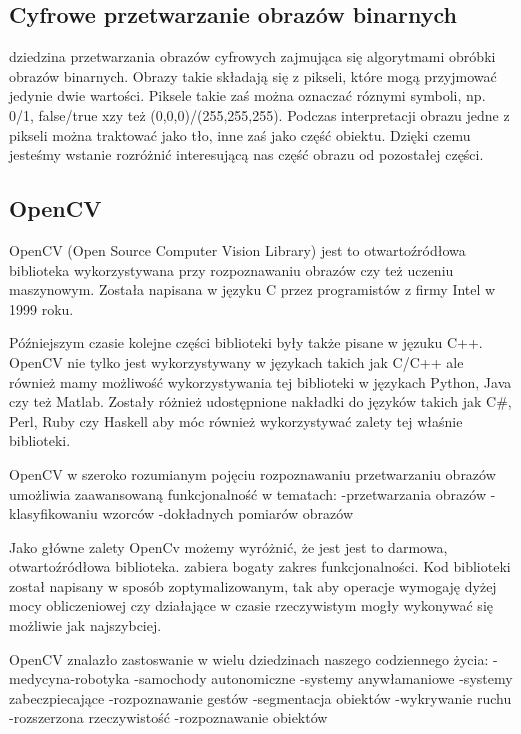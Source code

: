 \documentclass[a4paper,12pt,twoside,openany]{report}
\begin{document}
\subsection{Cyfrowe przetwarzanie obrazów binarnych}
dziedzina przetwarzania obrazów cyfrowych zajmująca się algorytmami obróbki obrazów binarnych. Obrazy takie składają się z pikseli, które mogą przyjmować jedynie dwie wartości. Piksele takie zaś można oznaczać róznymi symboli, np. 0/1, false/true xzy też (0,0,0)/(255,255,255). Podczas interpretacji obrazu jedne z pikseli można traktować jako tło, inne zaś jako część obiektu. Dzięki czemu jesteśmy wstanie rozróżnić interesującą nas część obrazu od pozostałej części. 

\subsection{OpenCV}
OpenCV (Open Source Computer Vision Library) jest to otwartoźródłowa biblioteka wykorzystywana przy rozpoznawaniu obrazów czy też uczeniu maszynowym. Została napisana w języku C przez programistów z firmy Intel w 1999 roku.

Późniejszym czasie kolejne części biblioteki były także pisane w jęzuku C++. OpenCV nie tylko jest wykorzystywany w językach takich jak C/C++ ale również mamy możliwość wykorzystywania tej biblioteki w językach Python, Java czy też Matlab. Zostały różnież udostępnione nakładki do języków takich jak C\#, Perl, Ruby czy Haskell aby móc również wykorzystywać zalety tej właśnie biblioteki. 

OpenCV w szeroko rozumianym pojęciu rozpoznawaniu przetwarzaniu obrazów umożliwia zaawansowaną funkcjonalność w tematach:
-przetwarzania obrazów
-klasyfikowaniu wzorców
-dokładnych pomiarów obrazów

Jako główne zalety OpenCv możemy wyróżnić, że jest jest to darmowa, otwartoźródłowa biblioteka. zabiera bogaty zakres funkcjonalności. Kod biblioteki został napisany w sposób zoptymalizowanym, tak aby operacje wymogaję dyżej mocy obliczeniowej czy działające w czasie rzeczywistym mogły wykonywać się możliwie jak najszybciej.

OpenCV znalazło zastoswanie w wielu dziedzinach naszego codziennego życia: 
-medycyna-robotyka
-samochody autonomiczne
-systemy anywłamaniowe 
-systemy zabeczpiecające
-rozpoznawanie gestów
-segmentacja obiektów
-wykrywanie ruchu
-rozszerzona rzeczywistość
-rozpoznawanie obiektów
\end{document}
